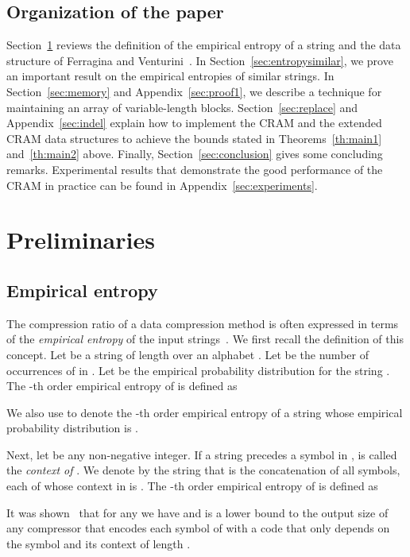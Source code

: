 \documentclass{llncs}
\begin{document}
\subsection{Organization of the paper}

Section~\ref{sec:preliminaries} reviews the definition of the empirical
entropy of a string and the data structure of Ferragina and
Venturini~\cite{FerVen07b}.
In Section~\ref{sec:entropysimilar}, we prove an important result on
the empirical entropies of similar strings.
In Section~\ref{sec:memory} and Appendix~\ref{sec:proof1}, we describe
a technique for maintaining an array of variable-length blocks.
Section~\ref{sec:replace} and Appendix~\ref{sec:indel} explain how to
implement the CRAM and the extended CRAM data structures to achieve
the bounds stated in Theorems~\ref{th:main1} and~\ref{th:main2} above.
Finally, Section~\ref{sec:conclusion} gives some concluding remarks.
Experimental results that demonstrate the good performance of the CRAM
in practice can be found in Appendix~\ref{sec:experiments}.




\section{Preliminaries}\label{sec:preliminaries}

\subsection{Empirical entropy}\label{sec:entropydef}

The compression ratio of a data compression method is often expressed in
terms of the \emph{empirical entropy} of the input strings~\cite{KosMan99}.
We first recall the definition of this concept.
Let  be a string of length  over an alphabet
.
Let  be the number of occurrences of  in .  
Let  be the empirical probability distribution for the string .
The -th order empirical entropy of  is defined as

We also use  to denote the -th order empirical entropy of a string
whose empirical probability distribution is .


Next, let  be any non-negative integer.
If a string  precedes a symbol  in ,
 is called the \emph{context of }.
We denote by  the string that is the concatenation of 
all symbols, each of whose context in  is .
The -th order empirical entropy of  is defined as

It was shown~\cite{Man01} that for any  we have 
and  is a lower bound to the output size of any compressor that encodes each symbol
of  with a code that only depends on the symbol and its context of length .
\end{document}
